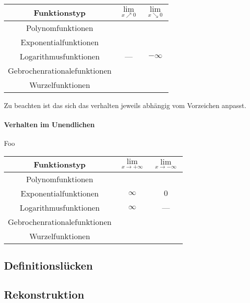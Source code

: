 \documentclass{article}
\begin{document}
		\begin{tabular}{|c|c|c|}
			\hline 
			Funktionstyp & $\lim\limits_{x \nearrow 0}$& $\lim\limits_{x \searrow 0}$ \\
			\hline
			Polynomfunktionen & & \\
			\hline
			Exponentialfunktionen & & \\
			\hline
			Logarithmusfunktionen & --- & $- \infty$ \\
			\hline
			Gebrochenrationalefunktionen & & \\
			\hline
			Wurzelfunktionen & & \\ 
			\hline
		\end{tabular}
		 Zu beachten ist das sich das verhalten jeweils abhängig vom Vorzeichen anpasst.
		
		\paragraph{Verhalten im Unendlichen}\label{Verhalten Im unendlichen}
			Foo\\
		
				\begin{tabular}{|c|c|c|}
			\hline 
			Funktionstyp & $\lim\limits_{x \rightarrow + \infty}$& $\lim\limits_{x \rightarrow - \infty}$ \\
			\hline
			Polynomfunktionen & & \\
			\hline
			Exponentialfunktionen & $\infty$ & $0$ \\
			\hline
			Logarithmusfunktionen & $\infty$ & --- \\
			\hline
			Gebrochenrationalefunktionen & & \\
			\hline
			Wurzelfunktionen & & \\ 
			\hline
		\end{tabular}
		
	\subsection{Definitionslücken}\label{Definitionslücke}
	
	\subsection{Rekonstruktion}\label{Rekonstruktion}
\end{document}
